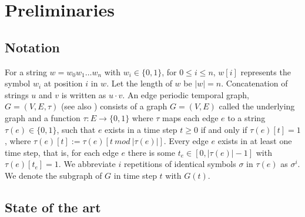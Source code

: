 \chapter{Preliminaries}
\label{ch:Preliminaries}

\section{Notation}
For a string $w = w_0w_1 \dots w_n$ with $w_i \in \{0, 1\}$, for $0 \leq i \leq n$, $w[i]$ represents the symbol $w_i$ at position $i$ in $w$. Let the length of $w$ be $|w| = n$. Concatenation of strings $u$ and $v$ is written as $u \cdot v$. An edge periodic temporal graph, $G = (V, E, \tau)$ (see also \cite{erlebach2020game}) consists of a graph $G = (V, E)$ called the underlying graph and a function $\tau : E \rightarrow \{0, 1\}$ where $\tau$ maps each edge $e$ to a string $\tau(e) \in \{0, 1\}$, such that $e$ exists in a time step $t \geq 0$ if and only if $\tau(e)[t] = 1$, where $\tau(e)[t] := \tau(e)[t~ mod~ |\tau(e)|]$. Every edge $e$ exists in at least one time step, that is, for each edge $e$ there is some $t_e \in [0, |\tau(e)| - 1]$ with $\tau(e)[t_e] = 1$. We abbreviate $i$ repetitions of identical symbols $\sigma$ in $\tau(e)$ as $\sigma^i$. We denote the subgraph of $G$ in time step $t$ with $G(t)$.


\section{State of the art}
